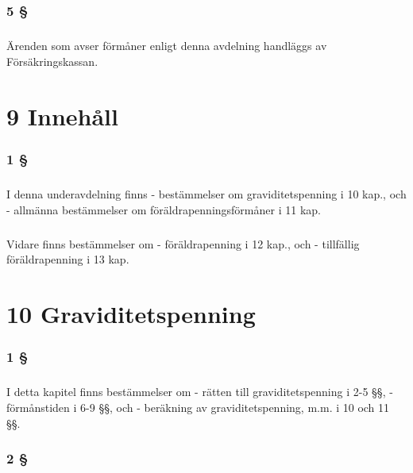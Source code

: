 \documentclass[a4paper,notitlepage,openany,10pt]{book}
\begin{document}
\subsection*{5 §}
\paragraph*{}
Ärenden som avser förmåner enligt denna avdelning handläggs av Försäkringskassan.
\chapter*{9 Innehåll}
\subsection*{1 §}
\paragraph*{}
I denna underavdelning finns
\newline - bestämmelser om graviditetspenning i 10 kap., och
\newline - allmänna bestämmelser om föräldrapenningsförmåner i 11 kap.
\paragraph*{}
Vidare finns bestämmelser om
\newline - föräldrapenning i 12 kap., och
\newline - tillfällig föräldrapenning i 13 kap.
\chapter*{10 Graviditetspenning}
\subsection*{1 §}
\paragraph*{}
I detta kapitel finns bestämmelser om
\newline - rätten till graviditetspenning i 2-5 §§,
\newline - förmånstiden i 6-9 §§, och
\newline - beräkning av graviditetspenning, m.m. i 10 och 11 §§.
\subsection*{2 §}
\end{document}
